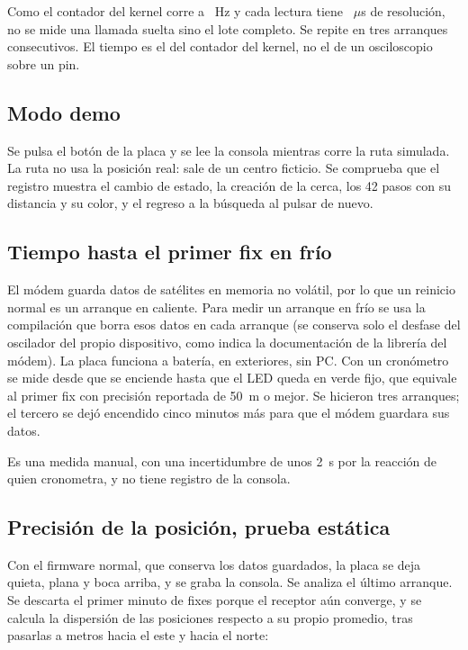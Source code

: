 Como el contador del kernel corre a \dClockHz~Hz y cada lectura tiene \dTickUs~$\mu$s de resolución,
no se mide una llamada suelta sino el lote completo. Se repite en tres arranques consecutivos. El
tiempo es el del contador del kernel, no el de un osciloscopio sobre un pin.

\subsection{Modo demo}

Se pulsa el botón de la placa y se lee la consola mientras corre la ruta simulada. La ruta no usa
la posición real: sale de un centro ficticio. Se comprueba que el registro muestra el cambio de
estado, la creación de la cerca, los 42 pasos con su distancia y su color, y el regreso a la
búsqueda al pulsar de nuevo.

\subsection{Tiempo hasta el primer fix en frío}

El módem guarda datos de satélites en memoria no volátil, por lo que un reinicio normal es un
arranque en caliente. Para medir un arranque en frío se usa la compilación que borra esos datos en
cada arranque (se conserva solo el desfase del oscilador del propio dispositivo, como indica la
documentación de la librería del módem). La placa funciona a batería, en exteriores, sin PC. Con un
cronómetro se mide desde que se enciende hasta que el LED queda en verde fijo, que equivale al primer
fix con precisión reportada de 50~m o mejor. Se hicieron tres arranques; el tercero se dejó encendido
cinco minutos más para que el módem guardara sus datos.

Es una medida manual, con una incertidumbre de unos 2~s por la reacción de quien cronometra, y no
tiene registro de la consola.

\subsection{Precisión de la posición, prueba estática}

Con el firmware normal, que conserva los datos guardados, la placa se deja quieta, plana y boca
arriba, y se graba la consola. Se analiza el último arranque. Se descarta el primer minuto de fixes
porque el receptor aún converge, y se calcula la dispersión de las posiciones respecto a su propio
promedio, tras pasarlas a metros hacia el este y hacia el norte:

